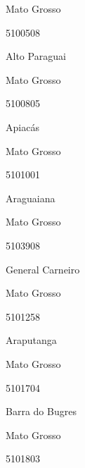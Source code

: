 \documentclass[
  letterpaper,
]{report}
\begin{document}
\n      

Mato Grosso

\n      

5100508

\n      

Alto Paraguai

\n    

\n    

\n      

Mato Grosso

\n      

5100805

\n      

Apiacás

\n    

\n    

\n      

Mato Grosso

\n      

5101001

\n      

Araguaiana

\n    

\n    

\n      

Mato Grosso

\n      

5103908

\n      

General Carneiro

\n    

\n    

\n      

Mato Grosso

\n      

5101258

\n      

Araputanga

\n    

\n    

\n      

Mato Grosso

\n      

5101704

\n      

Barra do Bugres

\n    

\n    

\n      

Mato Grosso

\n      

5101803
\end{document}
